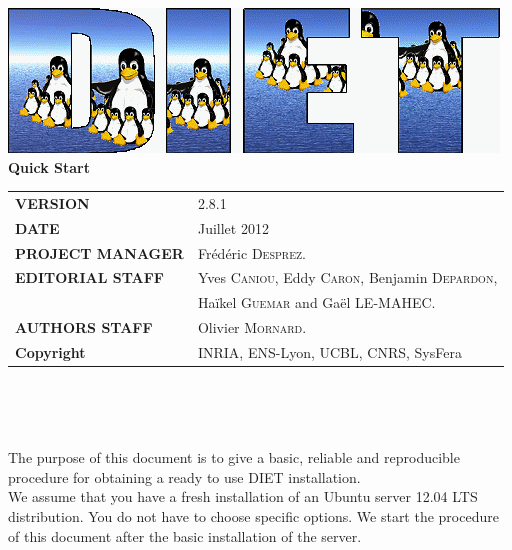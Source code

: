 \documentclass[12pt,a4paper]{book}
\newcommand{\dietversion}{2.8.1}
\begin{document}

\thispagestyle{empty}
\vspace*{3cm}
\vspace*{3cm}

\begin{center}
\includegraphics[scale=.5]{fig/logo_DIET_big}\\[2ex]
\textbf{\Huge Quick Start\\[2ex]}
\end{center}

\vfill

\noindent
\small{
\begin{tabular}{ll}
  \textbf{VERSION}  & \dietversion\\
  \textbf{DATE}     & Juillet 2012\\
  \textbf{PROJECT MANAGER}  & Fr\'ed\'eric \textsc{Desprez}.\\
  \textbf{EDITORIAL STAFF}  & Yves \textsc{Caniou}, Eddy
  \textsc{Caron}, Benjamin \textsc{Depardon},\\
  & Ha\"ikel \textsc{Guemar} and Ga\"el \textsc{LE-MAHEC}.\\
  \textbf{AUTHORS STAFF}    & 
\begin{minipage}[t]{12cm}
  Olivier \textsc{Mornard}.
\end{minipage} \\
  \textbf{Copyright}& INRIA, ENS-Lyon, UCBL, CNRS, SysFera
\end{tabular}\\
}

\newpage
\thispagestyle{empty}
\ 



\newpage
\tableofcontents

\setlength{\columnseprule}{1pt}

\noindent The purpose of this document is to give a basic, reliable and reproducible procedure for obtaining a ready to use DIET installation.\\

\noindent We assume that you have a fresh installation of an Ubuntu server 12.04 LTS distribution. You do not have to choose specific options. We start the procedure of this document after the basic installation of the server.
\end{document}
